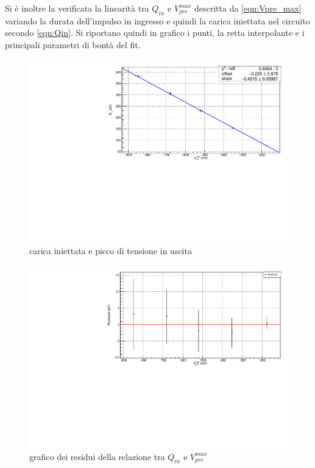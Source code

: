 \documentclass{article}
\begin{document}
Si è inoltre la verificata la linearità tra $Q_{in}$ e $V_{pre}^{max}$ descritta da \ref{eqn:Vpre_max} variando la durata dell'impulso
in ingresso e quindi la carica iniettata nel circuito secondo \ref{eqn:Qin}. Si riportano quindi in grafico i punti, la retta 
interpolante e i principali parametri di bontà del fit. 

\begin{center}
\begin{figure}[H]
\centering
\includegraphics[scale=0.4, angle=0]{fitpreamp.pdf}
\caption{carica iniettata e picco di tensione in uscita}
\label{fig:QinvsVpre}
\end{figure}
\end{center}

\begin{center}
\begin{figure}[H]
\centering
\includegraphics[scale=0.4, angle=0]{residuipreamp.pdf}
\caption{grafico dei residui della relazione tra $Q_{in}$ e $V_{pre}^{max}$}
\label{fig:QinvsVpre_res}
\end{figure}
\end{center}
\end{document}
